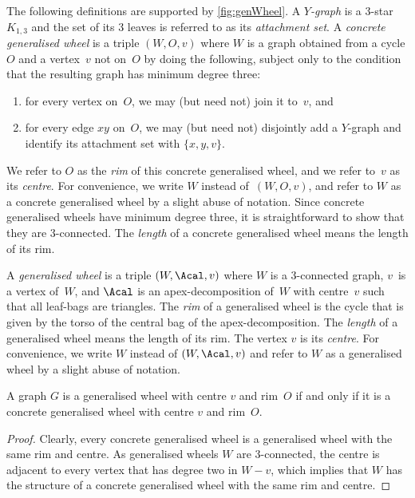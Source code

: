 \documentclass{aic}
\theoremstyle{plain}
\theoremstyle{definition}
\theoremstyle{plain}
\theoremstyle{plain}
\begin{document}
The following definitions are supported by \autoref{fig:genWheel}.
A \emph{$Y$-graph} is a 3-star~$K_{1,3}$ and the set of its 3 leaves is referred to as its \emph{attachment set}.
A \emph{concrete generalised wheel} is a triple $(W,O,v)$ where $W$ is a graph obtained from a cycle $O$ and a vertex~$v$ not on~$O$ by doing the following, subject only to the condition that the resulting graph has minimum degree three:
\begin{enumerate}
    \item for every vertex on~$O$, we may (but need not) join it to~$v$, and
    \item for every edge $xy$ on~$O$, we may (but need not) disjointly add a $Y$-graph and identify its attachment set with $\{x,y,v\}$.
\end{enumerate}
We refer to $O$ as the \emph{rim} of this concrete generalised wheel, and we refer to~$v$ as its \emph{centre}.
For convenience, we write $W$ instead of~$(W,O,v)$, and refer to $W$ as a concrete generalised wheel by a slight abuse of notation.
Since concrete generalised wheels have minimum degree three, it is straightforward to show that they are 3-connected.
The \emph{length} of a concrete generalised wheel means the length of its rim.

A \emph{generalised wheel} is a triple $(W,\Acal,v)$ where $W$ is a 3-connected graph, $v$~is a vertex of~$W$, and $\Acal$ is an apex-decomposition of~$W$ with centre~$v$ such that all leaf-bags are triangles.
The \emph{rim} of a generalised wheel is the cycle that is given by the torso of the central bag of the apex-decomposition.
The \emph{length} of a generalised wheel means the length of its rim.
The vertex $v$ is its \emph{centre}.
For convenience, we write $W$ instead of $(W,\Acal,v)$ and refer to $W$ as a generalised wheel by a slight abuse of notation.

\begin{lem}\label{make-concrete}
A graph $G$ is a generalised wheel with centre $v$ and rim~$O$ if and only if it is a concrete generalised wheel with centre $v$ and rim~$O$.
\end{lem}

\begin{proof}
Clearly, every concrete generalised wheel is a generalised wheel with the same rim and centre. 
As generalised wheels $W$ are 3-connected, the centre is adjacent to every vertex that has degree two in $W-v$, which implies that $W$ has the structure of a concrete generalised wheel with the same rim and centre. 
\end{proof}
\end{document}
